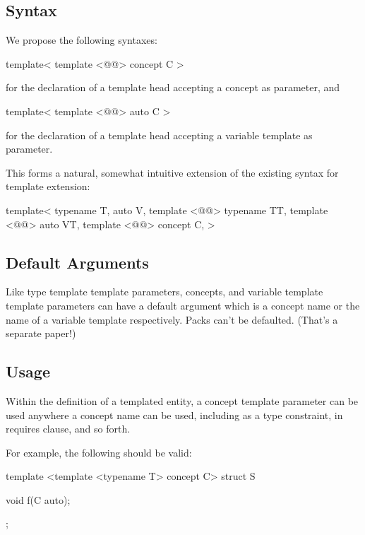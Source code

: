 \documentclass{wg21}
\begin{document}
\subsection{Syntax}

We propose the following syntaxes:

\begin{colorblock}
template<
    template <@@> concept C
>
\end{colorblock}

for the declaration of a template head accepting a concept as parameter, and

\begin{colorblock}
template<
    template <@@> auto C
>
\end{colorblock}

for the declaration of a template head accepting a variable template as parameter.

This forms a natural, somewhat intuitive extension of the existing syntax for template extension:
\begin{colorblock}
template<
    typename T,
    auto V,
    template <@@> typename TT,
    template <@@> auto VT,
    template <@@> concept C,
>
\end{colorblock}

\subsection{Default Arguments}

Like type template template parameters, concepts, and variable template template
parameters can have a default argument which is a concept name or the name of a variable template respectively.
Packs can't be defaulted. (That's a separate paper!)

\subsection{Usage}

Within the definition of a templated entity, a concept template parameter
can be used anywhere a concept name can be used, including as a type constraint, in requires clause, and so forth.

For example, the following should be valid:

\begin{colorblock}
template <template <typename T> concept C>
struct S {
    void f(C auto);

};
\end{colorblock}
\end{document}
